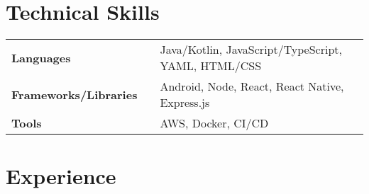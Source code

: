 \documentclass[a4,10pt]{article}
\newcommand{\hskills}[1]{
\textbf{\bfseries #1} }
\begin{document}
\section{Technical Skills}
\begin{tabular}{p{11em} p{1em} p{43em}}
\hskills{Languages }&  &  Java/Kotlin, JavaScript/TypeScript, YAML, HTML/CSS\\
\hskills{Frameworks/Libraries} &  & Android, Node, React, React Native, Express.js\\
\hskills{Tools} &  & AWS, Docker, CI/CD\\
\end{tabular}
\vspace{-0.3cm}


\section{Experience}

        
\end{document}
